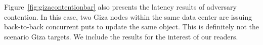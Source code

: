 Figure~\ref{fig:gizacontentionbar} also presents the latency results of adversary contention. In this case, two Giza nodes within the same data center are issuing back-to-back concurrent puts to update the same object. This is definitely not the scenario Giza targets. We include the results for the interest of our readers.






